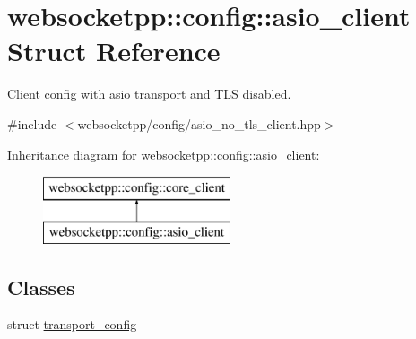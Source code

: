 \hypertarget{structwebsocketpp_1_1config_1_1asio__client}{}\section{websocketpp\+:\+:config\+:\+:asio\+\_\+client Struct Reference}
\label{structwebsocketpp_1_1config_1_1asio__client}


Client config with asio transport and T\+L\+S disabled.  




{\ttfamily \#include $<$websocketpp/config/asio\+\_\+no\+\_\+tls\+\_\+client.\+hpp$>$}

Inheritance diagram for websocketpp\+:\+:config\+:\+:asio\+\_\+client\+:\begin{figure}[H]
\begin{center}
\leavevmode
\includegraphics[height=2.000000cm]{structwebsocketpp_1_1config_1_1asio__client}
\end{center}
\end{figure}
\subsection*{Classes}
\begin{DoxyCompactItemize}
\item 
struct \hyperlink{structwebsocketpp_1_1config_1_1asio__client_1_1transport__config}{transport\+\_\+config}
\end{DoxyCompactItemize}
